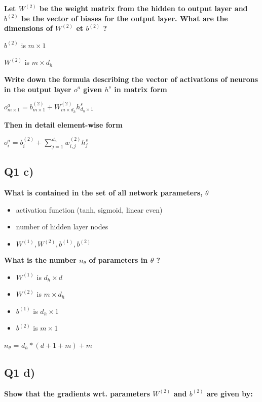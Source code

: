 \documentclass{article}
\begin{document}
    \textbf{Let $W^{(2)}$ be the weight matrix from the hidden to output
layer and $b^{(2)}$ be the} \textbf{vector of biases for the output
layer. What are the dimensions of $W^{(2)}$ et $b^{(2)}$ ?}

$b^{(2)}$ is $m \times 1$

$W^{(2)}$ is $m \times d_h$

    \textbf{Write down the formula describing the vector of activations of
neurons in the output} \textbf{layer $o^a$ given $h^s$ in matrix form}

$o^a_{m \times 1} = b^{(2)}_{m \times 1} + W^{(2)}_{m \times d_h} h^s_{d_h \times 1}$

    \textbf{Then in detail element-wise form}

$o^a_i = b^{(2)}_i + \sum\limits_{j=1}^{d_h} w^{(2)}_{i, j} h^s_j$

    \subsection{Q1 c)}\label{q1-c}

    \textbf{What is contained in the set of all network parameters,
$\theta$}

\begin{itemize}
\itemsep1pt\parskip0pt
\item
  activation function (tanh, sigmoid, linear even)
\item
  number of hidden layer nodes
\item
  $W^{(1)}, W^{(2)}, b^{(1)}, b^{(2)}$
\end{itemize}

    \textbf{What is the number $n_{\theta}$ of parameters in $\theta$ ?}

\begin{itemize}
\itemsep1pt\parskip0pt
\item
  $W^{(1)}$ is $d_h \times d$
\item
  $W^{(2)}$ is $m \times d_h$
\item
  $b^{(1)}$ is $d_h \times 1$
\item
  $b^{(2)}$ is $m \times 1$
\end{itemize}

$n_{\theta}$ = $d_h * (d+1 + m) + m$

    \subsection{Q1 d)}\label{q1-d}

    \textbf{Show that the gradients wrt. parameters $W^{(2)}$ and $b^{(2)}$
are given by:}
\end{document}
